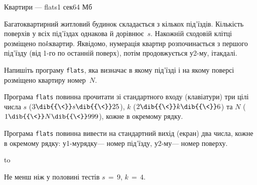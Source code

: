 \begin{problem}{Квартири --- flats}{}{}{1 сек}{64 Мб}


Багатоквартирний житловий будинок складається з кількох під’їздів. Кількість поверхів у всіх під’їздах однакова й дорівнює~$s$. На\nolinebreak[2] кожній сходовій клітці розміщено по\nolinebreak[2] $k$\nolinebreak[2] квартир. Як\nolinebreak[3] відомо, нумерація квартир розпочинається з першого під'їзду (від \mbox{1-го} по останній поверх), потім продовжується у\nolinebreak[3] \mbox{2-му}, і\nolinebreak[2] так\nolinebreak[2] далі.

\Task 
Напишіть програму \texttt{flats}, яка визначає в якому під’їзді і на якому поверсі розміщено квартиру номер~$N$.

\InputFile
Програма \texttt{flats} повинна прочитати зі стандартного входу (клавіатури) три цілі числа $s$ ($3\dib{{\<}}s\dib{{\<}}25$), $k$ ($2\dib{{\<}}k\dib{{\<}}6$) та $N$ ($1\dib{{\<}}N\dib{{\<}}999$), кожне в окремому рядку.

\OutputFile
Програма \texttt{flats} повинна вивести на стандартний вихід (екран) два числа, кожне в окремому рядку: у\nolinebreak[2] \mbox{1-му}\nolinebreak[2] рядку\nolinebreak[3] --- номер під’їзду, у\nolinebreak[2] \mbox{2-му}\nolinebreak[3] --- номер поверху.

\Examples
\par\noindent\hbox to 

\Note 
Не менш ніж у половині тестів ${s\,{=}\,9}$, ${k\,{=}\,4}$.

\end{problem}
